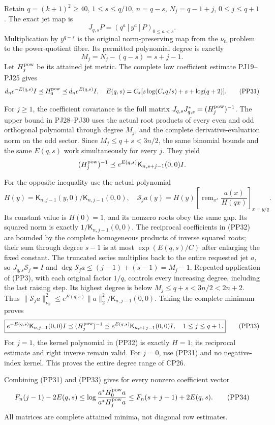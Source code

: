 \documentclass[10pt]{article}
\begin{document}
Retain \(q=(k+1)^2\ge40\), \(1\le s\le q/10\), \(n=q-s\), \(N_j=q-1+j\), \(0\le j\le q+1\). The exact jet map is \[
J_{q,s}P=(q^a[y^a]P)_{0\le a<s}.
\] Multiplication by \(y^{q-s}\) is the original norm-preserving map from the \(\nu_n\) problem to the power-quotient fibre. Its permitted polynomial degree is exactly \[
M_j=N_j-(q-s)=s+j-1.
\tag{PP30}
\] Let \(H_j^{\rm pow}\) be its attained jet metric. The complete low coefficient estimate PJ19--PJ25 gives \[
d_ne^{-E(q,s)}I\preceq H_0^{\rm pow}\preceq d_ne^{E(q,s)}I,
\quad E(q,s)=C_*[s\log(C_*q/s)+s+\log(q+2)].
\tag{PP31}
\]

For \(j\ge1\), the coefficient covariance is the full matrix \(J_{q,s}J_{q,s}^*=(H_j^{\rm pow})^{-1}\). The upper bound in PJ28--PJ30 uses the actual root products of every even and odd orthogonal polynomial through degree \(M_j\), and the complete derivative-evaluation norm on the odd sector. Since \(M_j\le q+s<3n/2\), the same binomial bounds and the same \(E(q,s)\) work simultaneously for every \(j\). They yield \[
(H_j^{\rm pow})^{-1}\preceq e^{E(q,s)}\mathsf K_{n,s+j-1}(0,0)I.
\]

For the opposite inequality use the actual polynomial \[
H(y)=\mathsf K_{n,j-1}(y,0)/\mathsf K_{n,j-1}(0,0),
\quad
\mathscr S_ja(y)=H(y)\left[\operatorname{rem}_{x^s}
\frac{a(x)}{H(qx)}\right]_{x=y/q}.
\tag{PP32}
\] Its constant value is \(H(0)=1\), and its nonzero roots obey the same gap. Its squared norm is exactly \(1/\mathsf K_{n,j-1}(0,0)\). The reciprocal coefficients in (PP32) are bounded by the complete homogeneous products of inverse squared roots; their sum through degree \(s-1\) is at most \(\exp(E(q,s)/C)\) after enlarging the fixed constant. The truncated series multiplies back to the entire requested jet \(a\), so \(J_{q,s}\mathscr S_j=I\) and \(\deg\mathscr S_ja\le(j-1)+(s-1)=M_j-1\). Repeated application of (PP3), with each original factor \(1/q\), controls every increasing degree, including the last raising step. Its highest degree is below \(M_j\le q+s<3n/2<2n+2\). Thus \(\|\mathscr S_ja\|_{\nu_n}^2\le e^{E(q,s)}\|a\|_2^2/\mathsf K_{n,j-1}(0,0)\). Taking the complete minimum proves \[
\boxed{
e^{-E(q,s)}\mathsf K_{n,j-1}(0,0)I
\preceq(H_j^{\rm pow})^{-1}
\preceq e^{E(q,s)}\mathsf K_{n,s+j-1}(0,0)I,
\quad1\le j\le q+1.
}
\tag{PP33}
\] For \(j=1\), the kernel polynomial in (PP32) is exactly \(H=1\); its reciprocal estimate and right inverse remain valid. For \(j=0\), use (PP31) and no negative-index kernel. This proves the entire degree range of CP26.

Combining (PP31) and (PP33) gives for every nonzero coefficient vector \[
F_n(j-1)-2E(q,s)
\le\log\frac{a^*H_0^{\rm pow}a}{a^*H_j^{\rm pow}a}
\le F_n(s+j-1)+2E(q,s).
\tag{PP34}
\] All matrices are complete attained minima, not diagonal row estimates.
\end{document}
